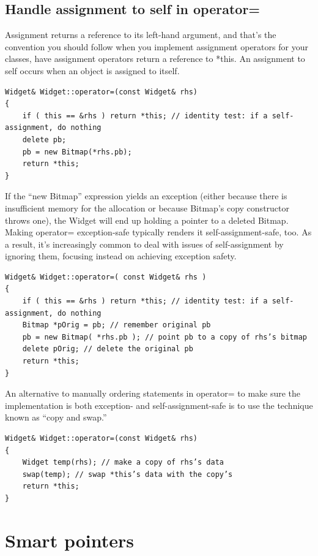 \documentclass[a4paper,12pt,notitlepage]{article}
\begin{document}
\subsection{Handle assignment to self in operator=}

Assignment returns a reference to its left-hand argument, and that's the convention you should
follow when you implement assignment operators for your classes, have assignment operators return a
reference to *this. An assignment to self occurs when an object is assigned to itself.

\begin{verbatim}
Widget& Widget::operator=(const Widget& rhs)
{
    if ( this == &rhs ) return *this; // identity test: if a self-assignment, do nothing
    delete pb;
    pb = new Bitmap(*rhs.pb);
    return *this;
}
\end{verbatim}

If the “new Bitmap” expression yields an exception (either because there is insufficient memory for
the allocation or because Bitmap's copy constructor throws one), the Widget will end up holding a
pointer to a deleted Bitmap. Making operator= exception-safe typically renders it
self-assignment-safe, too. As a result, it's increasingly common to deal with issues of
self-assignment by ignoring them, focusing instead on achieving exception safety.

\begin{verbatim}
Widget& Widget::operator=( const Widget& rhs )
{
    if ( this == &rhs ) return *this; // identity test: if a self-assignment, do nothing
    Bitmap *pOrig = pb; // remember original pb
    pb = new Bitmap( *rhs.pb ); // point pb to a copy of rhs’s bitmap
    delete pOrig; // delete the original pb
    return *this;
}
\end{verbatim}

An alternative to manually ordering statements in operator= to make sure the implementation is both
exception- and self-assignment-safe is to use the technique known as “copy and swap.”

\begin{verbatim}
Widget& Widget::operator=(const Widget& rhs)
{
    Widget temp(rhs); // make a copy of rhs’s data
    swap(temp); // swap *this’s data with the copy’s
    return *this;
}
\end{verbatim}


\section{Smart pointers}
\end{document}
